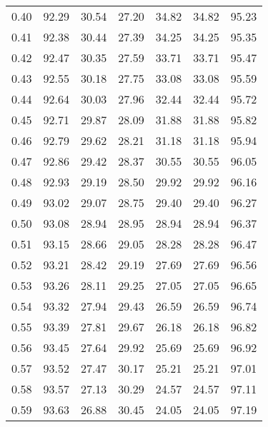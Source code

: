 \begin{tabular}{|c|c|c|c|c|c|c|}
      0.40 &     92.29 &     30.54 &      27.20 &   34.82 &      34.82 &         95.23 \\
      0.41 &     92.38 &     30.44 &      27.39 &   34.25 &      34.25 &         95.35 \\
      0.42 &     92.47 &     30.35 &      27.59 &   33.71 &      33.71 &         95.47 \\
      0.43 &     92.55 &     30.18 &      27.75 &   33.08 &      33.08 &         95.59 \\
      0.44 &     92.64 &     30.03 &      27.96 &   32.44 &      32.44 &         95.72 \\
      0.45 &     92.71 &     29.87 &      28.09 &   31.88 &      31.88 &         95.82 \\
      0.46 &     92.79 &     29.62 &      28.21 &   31.18 &      31.18 &         95.94 \\
      0.47 &     92.86 &     29.42 &      28.37 &   30.55 &      30.55 &         96.05 \\
      0.48 &     92.93 &     29.19 &      28.50 &   29.92 &      29.92 &         96.16 \\
      0.49 &     93.02 &     29.07 &      28.75 &   29.40 &      29.40 &         96.27 \\
      0.50 &     93.08 &     28.94 &      28.95 &   28.94 &      28.94 &         96.37 \\
      0.51 &     93.15 &     28.66 &      29.05 &   28.28 &      28.28 &         96.47 \\
      0.52 &     93.21 &     28.42 &      29.19 &   27.69 &      27.69 &         96.56 \\
      0.53 &     93.26 &     28.11 &      29.25 &   27.05 &      27.05 &         96.65 \\
      0.54 &     93.32 &     27.94 &      29.43 &   26.59 &      26.59 &         96.74 \\
      0.55 &     93.39 &     27.81 &      29.67 &   26.18 &      26.18 &         96.82 \\
      0.56 &     93.45 &     27.64 &      29.92 &   25.69 &      25.69 &         96.92 \\
      0.57 &     93.52 &     27.47 &      30.17 &   25.21 &      25.21 &         97.01 \\
      0.58 &     93.57 &     27.13 &      30.29 &   24.57 &      24.57 &         97.11 \\
      0.59 &     93.63 &     26.88 &      30.45 &   24.05 &      24.05 &         97.19 \\

\end{tabular}

